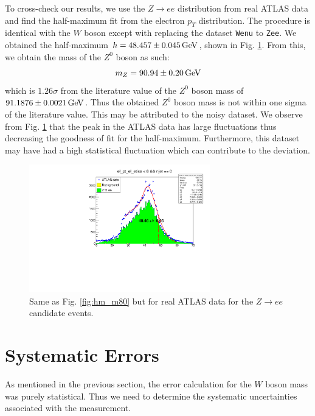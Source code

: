 \documentclass[a4paper]{report}
\numberwithin{equation}{section}
\begin{document}
To cross-check our results, we use the $Z \rightarrow ee$ distribution from real ATLAS data and find the half-maximum fit from 
the electron $p_T$ distribution. 
The procedure is identical with the $W$ boson except with replacing the dataset \texttt{Wenu} to 
\texttt{Zee}. We obtained the half-maximum $h = \SI{48.457 \pm 0.045}{\giga\electronvolt}$, shown in Fig. \ref{fig:hm_zee}. From this, 
we obtain the mass of the $Z^0$ boson as such: 
\begin{equation}
    m_Z = \SI{90.94 \pm 0.20}{\giga\electronvolt}
\end{equation}
which is $1.26\sigma$ from the literature value of the $Z^0$ boson mass of $\SI{91.1876 \pm 0.0021}{\giga\electronvolt}$. Thus the 
obtained $Z^0$ boson mass is not within one sigma of the literature value. This may be attributed to the noisy dataset. We observe from 
Fig. \ref{fig:hm_zee} that the peak in the ATLAS data has large fluctuations thus decreasing the goodness of fit for the half-maximum. Furthermore, this dataset may have had a high statistical fluctuation which can contribute to the deviation. 

\begin{figure}[htpb]
    \centering
    \includegraphics[width=0.7\textwidth]{hm_zee.pdf}
    \caption{Same as Fig. \ref{fig:hm_m80} but for real ATLAS data for the $Z \rightarrow ee$ candidate events.}
    \label{fig:hm_zee}
\end{figure}

\section{Systematic Errors}

As mentioned in the previous section, the error calculation for the $W$ boson mass was purely statistical. Thus we need to determine 
the systematic uncertainties associated with the measurement. 
\end{document}
